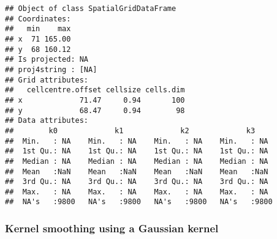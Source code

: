 \documentclass[]{article}
\begin{document}
\begin{verbatim}
## Object of class SpatialGridDataFrame
## Coordinates:
##   min    max
## x  71 165.00
## y  68 160.12
## Is projected: NA 
## proj4string : [NA]
## Grid attributes:
##   cellcentre.offset cellsize cells.dim
## x             71.47     0.94       100
## y             68.47     0.94        98
## Data attributes:
##        k0             k1             k2             k3      
##  Min.   : NA    Min.   : NA    Min.   : NA    Min.   : NA   
##  1st Qu.: NA    1st Qu.: NA    1st Qu.: NA    1st Qu.: NA   
##  Median : NA    Median : NA    Median : NA    Median : NA   
##  Mean   :NaN    Mean   :NaN    Mean   :NaN    Mean   :NaN   
##  3rd Qu.: NA    3rd Qu.: NA    3rd Qu.: NA    3rd Qu.: NA   
##  Max.   : NA    Max.   : NA    Max.   : NA    Max.   : NA   
##  NA's   :9800   NA's   :9800   NA's   :9800   NA's   :9800
\end{verbatim}

\hypertarget{kernel-smoothing-using-a-gaussian-kernel}{%
\subsubsection{Kernel smoothing using a Gaussian
kernel}\label{kernel-smoothing-using-a-gaussian-kernel}}
\end{document}
